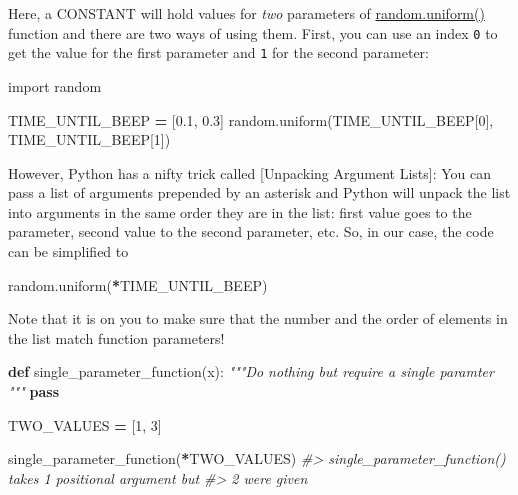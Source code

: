 \documentclass[
]{book}
\newenvironment{Shaded}{\begin{snugshade}}{\end{snugshade}}
\newcommand{\CommentTok}[1]{\textcolor[rgb]{0.56,0.35,0.01}{\textit{#1}}}
\newcommand{\ControlFlowTok}[1]{\textcolor[rgb]{0.13,0.29,0.53}{\textbf{#1}}}
\newcommand{\DecValTok}[1]{\textcolor[rgb]{0.00,0.00,0.81}{#1}}
\newcommand{\FloatTok}[1]{\textcolor[rgb]{0.00,0.00,0.81}{#1}}
\newcommand{\ImportTok}[1]{#1}
\newcommand{\KeywordTok}[1]{\textcolor[rgb]{0.13,0.29,0.53}{\textbf{#1}}}
\newcommand{\NormalTok}[1]{#1}
\newcommand{\OperatorTok}[1]{\textcolor[rgb]{0.81,0.36,0.00}{\textbf{#1}}}
\begin{document}
Here, a CONSTANT will hold values for \emph{two} parameters of \href{https://docs.python.org/3/library/random.html\#random.uniform}{random.uniform()} function and there are two ways of using them. First, you can use an index \texttt{0} to get the value for the first parameter and \texttt{1} for the second parameter:

\begin{Shaded}
\begin{Highlighting}[]
\ImportTok{import}\NormalTok{ random}

\NormalTok{TIME\_UNTIL\_BEEP }\OperatorTok{=}\NormalTok{ [}\FloatTok{0.1}\NormalTok{, }\FloatTok{0.3}\NormalTok{]}
\NormalTok{random.uniform(TIME\_UNTIL\_BEEP[}\DecValTok{0}\NormalTok{], TIME\_UNTIL\_BEEP[}\DecValTok{1}\NormalTok{])}
\end{Highlighting}
\end{Shaded}

However, Python has a nifty trick called {[}Unpacking Argument Lists{]}: You can pass a list of arguments prepended by an asterisk and Python will unpack the list into arguments in the same order they are in the list: first value goes to the parameter, second value to the second parameter, etc. So, in our case, the code can be simplified to

\begin{Shaded}
\begin{Highlighting}[]
\NormalTok{random.uniform(}\OperatorTok{*}\NormalTok{TIME\_UNTIL\_BEEP)}
\end{Highlighting}
\end{Shaded}

Note that it is on you to make sure that the number and the order of elements in the list match function parameters!

\begin{Shaded}
\begin{Highlighting}[]
\KeywordTok{def}\NormalTok{ single\_parameter\_function(x):}
  \CommentTok{"""Do nothing but require a single paramter}
\CommentTok{  """}
  \ControlFlowTok{pass}

\NormalTok{TWO\_VALUES }\OperatorTok{=}\NormalTok{ [}\DecValTok{1}\NormalTok{, }\DecValTok{3}\NormalTok{]}

\NormalTok{single\_parameter\_function(}\OperatorTok{*}\NormalTok{TWO\_VALUES)}
\CommentTok{\#\textgreater{} single\_parameter\_function() takes 1 positional argument but}
\CommentTok{\#\textgreater{} 2 were given}
\end{Highlighting}
\end{Shaded}
\end{document}
